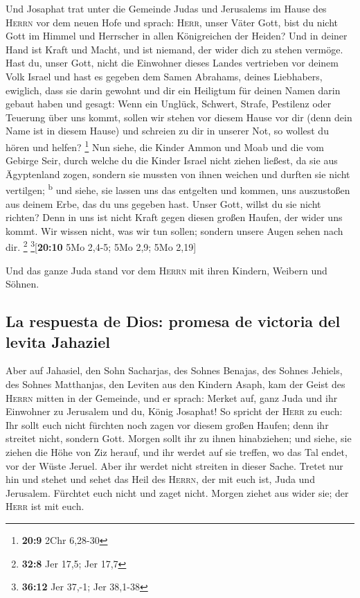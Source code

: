  Und Josaphat trat unter die Gemeinde Judas und Jerusalems
im Hause des \textsc{Herrn} vor dem neuen Hofe  und
sprach: \textsc{Herr}, unser Väter Gott, bist du nicht Gott im Himmel
und Herrscher in allen Königreichen der Heiden? Und in deiner Hand ist
Kraft und Macht, und ist niemand, der wider dich zu stehen vermöge.
 Hast du, unser Gott, nicht die Einwohner dieses Landes
vertrieben vor deinem Volk Israel und hast es gegeben dem Samen
Abrahams, deines Liebhabers, ewiglich,  dass sie darin
gewohnt und dir ein Heiligtum für deinen Namen darin gebaut haben und
gesagt:  Wenn ein Unglück, Schwert, Strafe, Pestilenz oder
Teuerung über uns kommt, sollen wir stehen vor diesem Hause vor dir
(denn dein Name ist in diesem Hause) und schreien zu dir in unserer Not,
so wollest du hören und helfen? \footnote{\textbf{20:9} 2Chr 6,28-30}
 Nun siehe, die Kinder Ammon und Moab und die vom Gebirge
Seir, durch welche du die Kinder Israel nicht ziehen ließest, da sie aus
Ägyptenland zogen, sondern sie mussten von ihnen weichen und durften sie
nicht vertilgen; \textsuperscript{b}  und siehe, sie
lassen uns das entgelten und kommen, uns auszustoßen aus deinem Erbe,
das du uns gegeben hast.  Unser Gott, willst du sie nicht
richten? Denn in uns ist nicht Kraft gegen diesen großen Haufen, der
wider uns kommt. Wir wissen nicht, was wir tun sollen; sondern unsere
Augen sehen nach dir. \footnote{\textbf{32:8} Jer 17,5; Jer 17,7}
\footnote{\textbf{36:12} Jer 37,-1; Jer 38,1-38}{[}\textbf{20:10} 5Mo
2,4-5; 5Mo 2,9; 5Mo 2,19{]}

 Und das ganze Juda stand vor dem \textsc{Herrn} mit
ihren Kindern, Weibern und Söhnen.

\hypertarget{la-respuesta-de-dios-promesa-de-victoria-del-levita-jahaziel}{%
\subsection{La respuesta de Dios: promesa de victoria del levita
Jahaziel}\label{la-respuesta-de-dios-promesa-de-victoria-del-levita-jahaziel}}

 Aber auf Jahasiel, den Sohn Sacharjas, des Sohnes
Benajas, des Sohnes Jehiels, des Sohnes Matthanjas, den Leviten aus den
Kindern Asaph, kam der Geist des \textsc{Herrn} mitten in der Gemeinde,
 und er sprach: Merket auf, ganz Juda und ihr Einwohner
zu Jerusalem und du, König Josaphat! So spricht der \textsc{Herr} zu
euch: Ihr sollt euch nicht fürchten noch zagen vor diesem großen Haufen;
denn ihr streitet nicht, sondern Gott.  Morgen sollt ihr
zu ihnen hinabziehen; und siehe, sie ziehen die Höhe von Ziz herauf, und
ihr werdet auf sie treffen, wo das Tal endet, vor der Wüste Jeruel.
 Aber ihr werdet nicht streiten in dieser Sache. Tretet
nur hin und stehet und sehet das Heil des \textsc{Herrn}, der mit euch
ist, Juda und Jerusalem. Fürchtet euch nicht und zaget nicht. Morgen
ziehet aus wider sie; der \textsc{Herr} ist mit euch.

